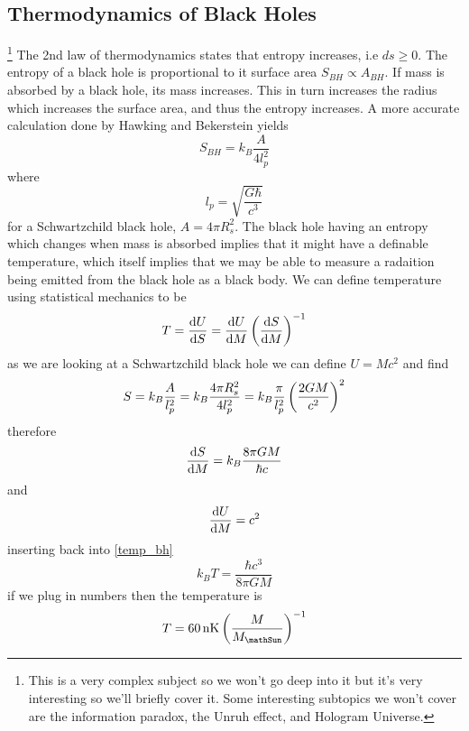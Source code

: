 \subsection{Thermodynamics of Black Holes}
\footnote{This is a very complex subject so we won't go deep into it but it's very interesting so we'll briefly cover it. Some interesting subtopics we won't cover are the information paradox, the Unruh effect, and Hologram Universe.}
The 2nd law of thermodynamics states that entropy increases, i.e \(ds \geq 0\). The entropy of a black hole is proportional to it surface area \(S_{BH} \propto A_{BH}\). If mass is absorbed by a black hole, its mass increases. This in turn increases the radius which increases the surface area, and thus the entropy increases. A more accurate calculation done by Hawking and Bekerstein yields
\begin{equation}
    S_{BH} = k_B \frac{A}{4l_p^2}
\end{equation}
where
\begin{equation}
    l_p = \sqrt{\frac{G\hbar}{c^3}}
\end{equation}
for a Schwartzchild black hole, \(A = 4\pi R_s^2\). The black hole having an entropy which changes when mass is absorbed implies that it might have a definable temperature, which itself implies that we may be able to measure a radaition being emitted from the black hole as a black body. We can define temperature using statistical mechanics to be
\begin{equation}\label{temp_bh}
    T = \diff{U}{S} = \diff{U}{M}\ins{\diff{S}{M}}^{-1}
\end{equation}
as we are looking at a Schwartzchild black hole we can define \(U=Mc^2\) and find
\begin{equation}
    S = k_B\frac{A}{l_p^2}=k_B\frac{4\pi R_s^2}{4l_p^2}=k_B\frac{\pi}{l_p^2}\left(\frac{2GM}{c^2}\right)^2
\end{equation}
therefore
\begin{equation}
    \diff{S}{M} = k_B\frac{8\pi GM}{\hbar c}
\end{equation}
and
\begin{equation}
    \diff{U}{M} = c^2
\end{equation}
inserting back into \ref{temp_bh}
\begin{equation}
    k_B T = \frac{\hbar c^3}{8\pi GM}
\end{equation}
if we plug in numbers then the temperature is
\begin{equation}
    T = \qty{60}{\nano\kelvin}\ins{\frac{M}{M_\mathSun}}^{-1}
\end{equation}
